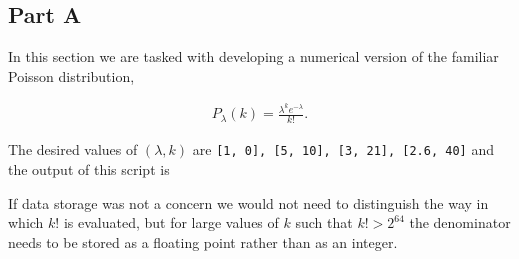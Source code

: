 \subsection{Part A}

In this section we are tasked with developing a numerical version of the familiar Poisson distribution,

\begin{align}
P_{\lambda}(k) = \frac{\lambda^{k} e^{-\lambda}}{k!}.
\end{align}



The desired values of $(\lambda, k)$ are \texttt{[1, 0], [5, 10], [3, 21], [2.6, 40]} and the output of this script is



If data storage was not a concern we would not need to distinguish the way in which $k!$ is evaluated, but for large values of $k$ such that $k! > 2^{64}$ the denominator needs to be stored as a floating point rather than as an integer.
